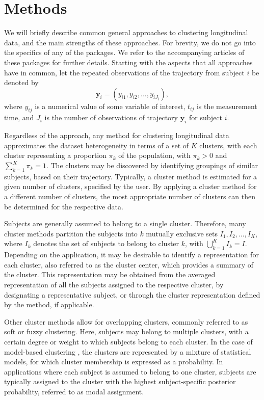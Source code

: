 \section{Methods}\label{sec:methods}

We will briefly describe common general approaches to clustering longitudinal data, and the main strengths of these approaches. For brevity, we do not go into the specifics of any of the packages. We refer to the accompanying articles of these packages for further details. Starting with the aspects that all approaches have in common, let the repeated observations of the trajectory from subject \(i\) be denoted by \[\mathbf{y}_i = (y_{i1}, y_{i2}, ..., y_{iJ_i}),\] where \(y_{ij}\) is a numerical value of some variable of interest, \(t_{ij}\) is the measurement time, and \(J_i\) is the number of observations of trajectory \(\mathbf{y}_i\) for subject \(i\).

Regardless of the approach, any method for clustering longitudinal data approximates the dataset heterogeneity in terms of a set of \(K\) clusters, with each cluster representing a proportion \(\pi_k\) of the population, with \(\pi_k > 0\) and \(\sum_{k = 1}^K \pi_k = 1\). The clusters may be discovered by identifying groupings of similar subjects, based on their trajectory. Typically, a cluster method is estimated for a given number of clusters, specified by the user. By applying a cluster method for a different number of clusters, the most appropriate number of clusters can then be determined for the respective data.

Subjects are generally assumed to belong to a single cluster. Therefore, many cluster methods partition the subjects into \(k\) mutually exclusive sets \(I_1, I_2, ..., I_K\), where \(I_k\) denotes the set of subjects to belong to cluster \(k\), with \(\bigcup_{k=1}^{K}I_{k}=I\). Depending on the application, it may be desirable to identify a representation for each cluster, also referred to as the cluster center, which provides a summary of the cluster. This representation may be obtained from the averaged representation of all the subjects assigned to the respective cluster, by designating a representative subject, or through the cluster representation defined by the method, if applicable.

Other cluster methods allow for overlapping clusters, commonly referred to as soft or fuzzy clustering. Here, subjects may belong to multiple clusters, with a certain degree or weight to which subjects belong to each cluster. In the case of model-based clustering \citep{mcnicholas2010model}, the clusters are represented by a mixture of statistical models, for which cluster membership is expressed as a probability. In applications where each subject is assumed to belong to one cluster, subjects are typically assigned to the cluster with the highest subject-specific posterior probability, referred to as modal assignment.

